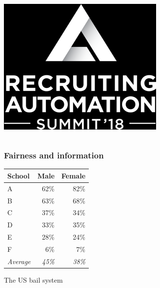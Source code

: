 \begin{frame}
\begin{columns}
\begin{column}{0.5\textwidth}
      \\
      \includegraphics[width=\columnwidth]{../figures/recruitement-automation}
    \end{column}
  \end{columns}
\end{frame}

\begin{frame}
  \frametitle{Fairness and information}
  \begin{example}
    \begin{table}[H]
      \begin{tabular}{l|r|r}
        School & Male  & Female\\
        \hline
        A & 62\% & 82\%\\
        B & 63\% & 68\%\\
        C & 37\% & 34\%\\
        D & 33\% & 35\%\\
        E & 28\% & 24\%\\
        F &  6\% &  7\%\\
        \hline
        \emph{Average} & \emph{45\%} & \emph{38\%}
      \end{tabular}
    \end{table}
  \end{example}
\end{frame}

\begin{frame}
  \centering
  {\Huge The US bail system}
\end{frame}

